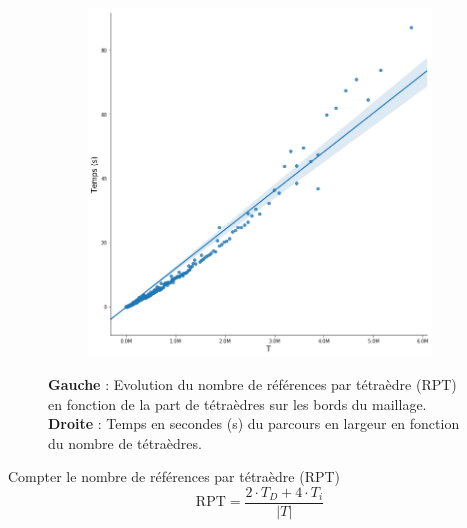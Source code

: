 \documentclass[9pt]{beamer}
\begin{document}
\begin{frame}
\begin{figure}[H]
\begin{subfigure}{.5\textwidth}
  \includegraphics[scale=0.18]{Images/T_time}
  \caption{}
\end{subfigure}
\caption{\textbf{Gauche} : Evolution du nombre de références par tétraèdre (RPT) en fonction de la part de tétraèdres sur les bords du maillage. \textbf{Droite} : Temps en secondes (s) du parcours en largeur en fonction du nombre de tétraèdres.}
\end{figure}
\begin{block}{Compter le nombre de références par tétraèdre (RPT)}
\begin{equation}
\text{RPT} = \frac{2\cdot T_D+4\cdot T_i}{|T|}
\end{equation}
\end{block}
\end{frame}
\end{document}
